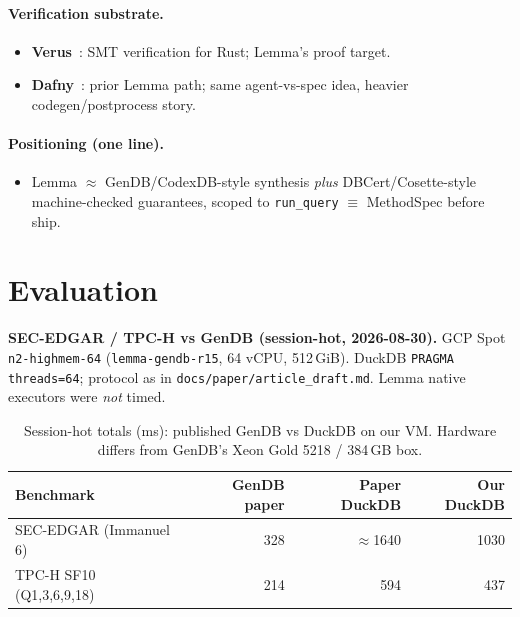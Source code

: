 \documentclass[sigconf, nonacm]{acmart}
\begin{document}
\paragraph{Verification substrate.}
\begin{itemize}
  \item \textbf{Verus}~\cite{Lattuada2023Verus}: SMT verification for Rust; Lemma's proof target.
  \item \textbf{Dafny}~\cite{Leino2010Dafny}: prior Lemma path; same agent-vs-spec idea, heavier codegen/postprocess story.
\end{itemize}

\paragraph{Positioning (one line).}
\begin{itemize}
  \item Lemma $\approx$ GenDB/CodexDB-style synthesis \emph{plus} DBCert/Cosette-style machine-checked guarantees, scoped to \texttt{run\_query} $\equiv$ MethodSpec before ship.
\end{itemize}

\section{Evaluation}

\noindent\textbf{SEC-EDGAR / TPC-H vs GenDB (session-hot, 2026-08-30).}
GCP Spot \texttt{n2-highmem-64} (\texttt{lemma-gendb-r15}, 64 vCPU, 512\,GiB).
DuckDB \texttt{PRAGMA threads=64}; protocol as in
\texttt{docs/paper/article\_draft.md}.
Lemma native executors were \emph{not} timed.

\begin{table}[t]
  \centering
  \small
  \caption{Session-hot totals (ms): published GenDB vs DuckDB on our VM.
    Hardware differs from GenDB's Xeon Gold 5218 / 384\,GB box.}
  \label{tab:gendb-duckdb-totals}
  \begin{tabular}{lrrr}
    \toprule
    Benchmark & GenDB paper & Paper DuckDB & Our DuckDB \\
    \midrule
    SEC-EDGAR (Immanuel 6) & 328 & $\approx$1640 & 1030 \\
    TPC-H SF10 (Q1,3,6,9,18) & 214 & 594 & 437 \\
    \bottomrule
  \end{tabular}
\end{table}
\end{document}
